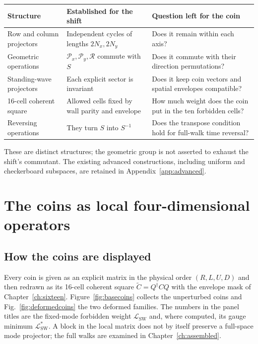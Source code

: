 \documentclass[11pt,a4paper,oneside]{report}
\newcommand{\sw}{\mathrm{SW}}
\numberwithin{equation}{chapter}
\begin{document}
\begin{center}\small
\begin{tabularx}{\textwidth}{@{}lYY@{}}\toprule
Structure & Established for the shift & Question left for the coin\\\midrule
Row and column projectors & Independent cycles of lengths \(2N_x,2N_y\)
& Does it remain within each axis?\\
Geometric operations & \(\mathcal P_x,\mathcal P_y,\mathcal R\) commute with \(S\)
& Does it commute with their direction permutations?\\
Standing-wave projectors & Each explicit sector is invariant
& Does it keep coin vectors and spatial envelopes compatible?\\
16-cell coherent square & Allowed cells fixed by wall parity and envelope
& How much weight does the coin put in the ten forbidden cells?\\
Reversing operations & They turn \(S\) into \(S^{-1}\)
& Does the transpose condition hold for full-walk time reversal?\\\bottomrule
\end{tabularx}
\end{center}
These are distinct structures; the geometric group is not asserted to
exhaust the shift's commutant. The existing advanced constructions,
including uniform and checkerboard subspaces, are retained in
Appendix~\ref{app:advanced}.

\chapter{The coins as local four-dimensional operators}
\label{ch:coins}

\section{How the coins are displayed}

Every coin is given as an explicit matrix in the physical order
\((R,L,U,D)\) and then redrawn as its 16-cell coherent square
\(\widetilde C=Q^\dagger CQ\) with the envelope mask of
Chapter~\ref{ch:sixteen}. Figure~\ref{fig:basecoins} collects the
unperturbed coins and Fig.~\ref{fig:deformedcoins} the two deformed
families. The numbers in the panel titles are the fixed-mode forbidden
weight \(\mathcal L_{\sw}\) and, where computed, its gauge minimum
\(\mathcal L^*_{\sw}\). A block in the local matrix does not by itself
preserve a full-space mode projector; the full walks are examined in
Chapter~\ref{ch:assembled}.
\end{document}
